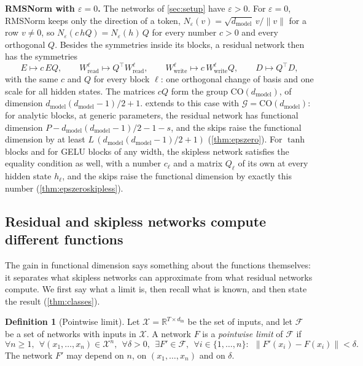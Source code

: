 \documentclass[10pt]{article}
\theoremstyle{definition}
\newtheorem*{definition*}{Definition}
\theoremstyle{remark}
\newcommand{\R}{\mathbb{R}}
\newcommand{\Wread}{W_{\mathrm{read}}}
\newcommand{\Wwrite}{W_{\mathrm{write}}}
\newcommand{\dm}{d_{\mathrm{model}}}
\newcommand{\CO}{\mathrm{CO}}
\newcommand{\G}{\mathcal{G}}
\newcommand{\norm}[1]{\lVert #1\rVert}
\newcommand{\para}[1]{\smallskip\noindent\textbf{#1}\hspace{0.5em}}
\begin{document}
\para{RMSNorm with $\varepsilon = 0$.} The networks of \cref{sec:setup} have $\varepsilon > 0$. For $\varepsilon = 0$, RMSNorm keeps only the direction of a token, $N_\varepsilon(v) = \sqrt{\dm}\,v/\norm{v}$ for a row $v \neq 0$, so $N_\varepsilon(c\,hQ) = N_\varepsilon(h)\,Q$ for every number $c > 0$ and every orthogonal $Q$. Besides the symmetries inside its blocks, a residual network then has the symmetries
\[
E \mapsto c\,EQ, \qquad \Wread^{\ell} \mapsto Q^\top\Wread^{\ell}, \qquad \Wwrite^{\ell} \mapsto c\,\Wwrite^{\ell}Q, \qquad D \mapsto Q^\top D,
\]
with the same $c$ and $Q$ for every block $\ell$: one orthogonal change of basis and one scale for all hidden states. The matrices $cQ$ form the group $\CO(\dm)$, of dimension $\dm(\dm-1)/2 + 1$.  extends to this case with $\G = \CO(\dm)$: for analytic blocks, at generic parameters, the residual network has functional dimension $P - \dm(\dm-1)/2 - 1 - s$, and the skips raise the functional dimension by at least $L\,(\dm(\dm-1)/2 + 1)$ (\cref{thm:epszero}). For $\tanh$ blocks and for GELU blocks of any width, the skipless network satisfies the equality condition as well, with a number $c_\ell$ and a matrix $Q_\ell$ of its own at every hidden state $h_\ell$, and the skips raise the functional dimension by exactly this number (\cref{thm:epszeroskipless}).

\subsection{Residual and skipless networks compute different functions}\label{sec:classes}

The gain in functional dimension says something about the functions themselves: it separates what skipless networks can approximate from what residual networks compute. We first say what a limit is, then recall what is known, and then state the result (\cref{thm:classes}).

\begin{definition*}[Pointwise limit]
Let $\mathcal X = \R^{T\times d_{\mathrm{in}}}$ be the set of inputs, and let $\mathcal F$ be a set of networks with inputs in $\mathcal X$. A network $F$ is a \emph{pointwise limit} of $\mathcal F$ if
\[
\forall n \ge 1,\ \ \forall (x_1, \dots, x_n) \in \mathcal X^n,\ \ \forall \delta > 0,\ \ \exists F' \in \mathcal F,\ \ \forall i \in \{1, \dots, n\}:\ \ \norm{F'(x_i) - F(x_i)} < \delta .
\]
The network $F'$ may depend on $n$, on $(x_1, \dots, x_n)$ and on $\delta$.
\end{definition*}
\end{document}
